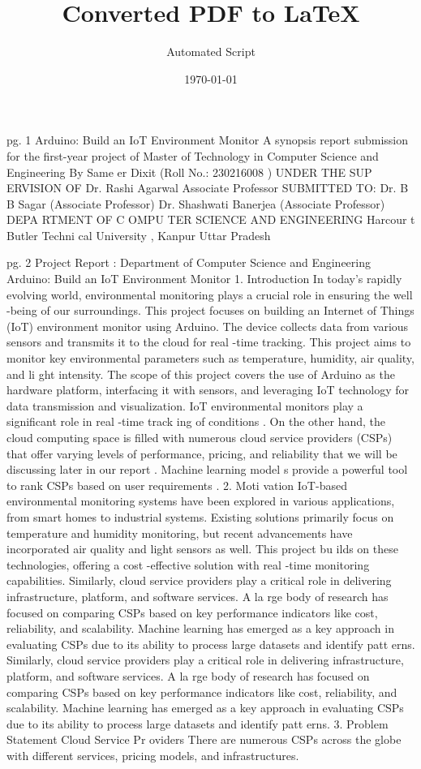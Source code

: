 \documentclass{article}
\title{Converted PDF to LaTeX}
\author{Automated Script}
\date{\today}
\begin{document}
\maketitle

 pg. 1 Arduino: Build an IoT Environment Monitor   A synopsis report submission  for the first-year project of   Master of Technology in Computer Science and Engineering     By  Same er Dixit  (Roll No.:  230216008 )    UNDER THE SUP ERVISION OF   Dr. Rashi Agarwal   Associate Professor   SUBMITTED TO:   Dr. B B Sagar  (Associate Professor)   Dr. Shashwati Banerjea (Associate Professor)     DEPA RTMENT OF C OMPU TER SCIENCE AND ENGINEERING     Harcour t Butler Techni cal University , Kanpur Uttar Pradesh     

 pg. 2 Project Report : Department of Computer Science and Engineering   Arduino: Build an IoT Environment Monitor   1. Introduction   In today's rapidly evolving world, environmental monitoring plays a crucial role in ensuring  the well -being of our surroundings. This project focuses on building an Internet of Things  (IoT) environment monitor using Arduino. The device collects data from various sensors  and transmits it to the cloud for real -time tracking. This project aims to monitor key  environmental parameters such as temperature, humidity, air quality, and li ght intensity.   The scope of this project covers the use of Arduino as the hardware platform, interfacing it  with sensors, and leveraging IoT technology for data transmission and visualization.  IoT  environmental monitors play a significant role in real -time track ing of conditions . On the  other hand, the cloud computing space is filled with numerous cloud service providers  (CSPs) that offer varying levels of performance, pricing, and reliability  that we will be  discussing later in our report . Machine learning model s provide a powerful tool to rank  CSPs based on user requirements .  2. Moti vation   IoT-based environmental monitoring systems  have been explored in various applications,  from smart homes to industrial systems. Existing solutions primarily focus on temperature  and humidity monitoring, but recent advancements have incorporated air quality and light  sensors as well. This project bu ilds on these technologies, offering a cost -effective solution  with real -time monitoring capabilities.   Similarly, cloud service providers play a critical role in delivering infrastructure, platform,  and software services. A la rge body of research has focused on comparing CSPs based on  key performance indicators like cost, reliability, and scalability. Machine learning has  emerged as a key approach in evaluating CSPs due to its ability to process large datasets and  identify patt erns.   Similarly, cloud service providers play a critical role in delivering infrastructure, platform,  and software services. A la rge body of research has focused on comparing CSPs based on  key performance indicators like cost, reliability, and scalability. Machine learning has  emerged as a key approach in evaluating CSPs due to its ability to process large datasets and  identify patt erns.   3. Problem Statement   Cloud Service Pr oviders   There are numerous CSPs across the globe with different services, pricing models, and  infrastructures.  
\end{document}

